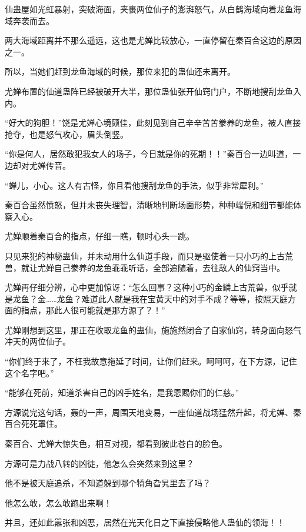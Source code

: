 \begin{this_body}
仙蛊屋如光虹暴射，突破海面，夹裹两位仙子的澎湃怒气，从白鹤海域向着龙鱼海域奔袭而去。

两大海域距离并不那么遥远，这也是尤婵比较放心，一直停留在秦百合这边的原因之一。

所以，当她们赶到龙鱼海域的时候，那位来犯的蛊仙还未离开。

尤婵布置的仙道蛊阵已经被破开大半，那位蛊仙张开仙窍门户，不断地搜刮龙鱼入内。

“好大的狗胆！”饶是尤婵心境颇佳，此刻见到自己辛辛苦苦豢养的龙鱼，被人直接抢夺，也是怒气攻心，眉头倒竖。

“你是何人，居然敢犯我女人的场子，今日就是你的死期！！”秦百合一边叫道，一边却对尤婵传音。

“蝉儿，小心。这人有古怪，你且看他搜刮龙鱼的手法，似乎非常犀利。”

秦百合虽然愤怒，但并未丧失理智，清晰地判断场面形势，种种端倪和细节都能体察入心。

尤婵顺着秦百合的指点，仔细一瞧，顿时心头一跳。

只见来犯的神秘蛊仙，并未动用什么仙道手段，而只是驱使着一只小巧的上古荒兽，就让尤婵自己豢养的龙鱼乖乖听话，全部追随着，去往敌人的仙窍当中。

尤婵再仔细分辨，心中更加惊讶：“怎么回事？这种小巧的金鳞上古荒兽，似乎就是龙鱼？金……龙鱼？难道此人就是我在宝黄天中的对手不成？等等，按照天庭方面的指点，那此人很可能就是那方源了？！”

尤婵刚想到这里，那正在收取龙鱼的蛊仙，施施然闭合了自家仙窍，转身面向怒气冲天的两位仙子。

“你们终于来了，不枉我故意拖延了时间，让你们赶来。呵呵呵，在下方源，记住这个名字吧。”

“能够在死前，知道杀害自己的凶手姓名，是我恩赐你们的仁慈。”

方源说完这句话，轰的一声，周围天地变易，一座仙道战场猛然升起，将尤婵、秦百合死死罩住。

秦百合、尤婵大惊失色，相互对视，都看到彼此苍白的脸色。

方源可是力战八转的凶徒，他怎么会突然来到这里？

他不是被天庭追杀，不知道躲到哪个犄角旮旯里去了吗？

他怎么敢，怎么敢跑出来啊！

并且，还如此嚣张和凶恶，居然在光天化日之下直接侵略他人蛊仙的领海！！

\end{this_body}

